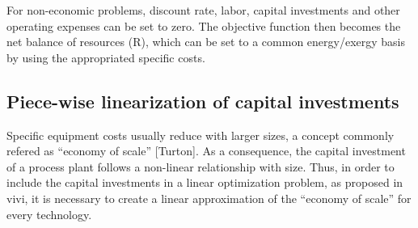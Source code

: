 \documentclass[10pt,twoside,a4paper]{report}
\begin{document}
  





For non-economic problems, discount rate, labor, capital investments
and other operating expenses can be set to zero. The objective
function then becomes the net balance of resources (R), which can be
set to a common energy/exergy basis by using the appropriated specific
costs.


\subsection{Piece-wise linearization of capital investments}

Specific equipment costs usually reduce with larger sizes, a concept
commonly refered as ``economy of scale'' [Turton]. As a consequence,
the capital investment of a process plant follows a non-linear
relationship with size. Thus, in order to include the capital
investments in a linear optimization problem, as proposed in vivi, it
is necessary to create a linear approximation of the ``economy of
scale'' for every technology.
\end{document}
